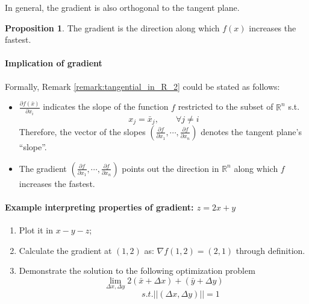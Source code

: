\documentclass[12pt]{article}
\newcommand{\R}{{\mathbb R}}
\theoremstyle{definition}
\newtheorem{proposition}[theorem]{Proposition}
\theoremstyle{plain}
\begin{document}
In general, the gradient is also orthogonal to the tangent plane.

\begin{proposition}
    The gradient is the direction along which $f(x)$ increases the fastest.
\end{proposition}


\paragraph{Implication of gradient}
Formally, Remark \ref{remark:tangential_in_R_2} could be stated as follows:
\begin{itemize}
    \item $\frac{\partial f(\bar x)}{\partial x_i}$ indicates the slope of the
        function $f$ restricted to the subset of $\R^n$ s.t.
        \[
            x_j = \bar x_j , \qquad \forall j \not = i
        \]
        Therefore, the vector of the slopes
        $ \left( \frac{\partial f}{ \partial x_1}, \cdots, \frac{\partial f}{\partial x_n} \right) $
        denotes the tangent plane's ``slope''.

    \item The gradient $\left( \frac{\partial f}{ \partial x_1}, \cdots,
        \frac{\partial f}{\partial x_n} \right)$ points out the direction in
        $\R^n$ along which $f$ increases the fastest.
\end{itemize}

\paragraph{Example interpreting properties of gradient: $z= 2x + y$}
\begin{enumerate}
    \item Plot it in $x-y-z$;
    \item Calculate the gradient at $(1,2)$ as: $\nabla f(1,2) = (2,1)$ through
        definition.
    \item Demonstrate the solution to the following optimization problem
        \[
            \underset{\Delta x, \Delta y} \lim 2(\bar x + \Delta x) + (\bar y +
            \Delta y)
        \]
        \[\qquad \qquad s.t. || (\Delta x , \Delta y) || =  1\]
\end{enumerate}
\end{document}
